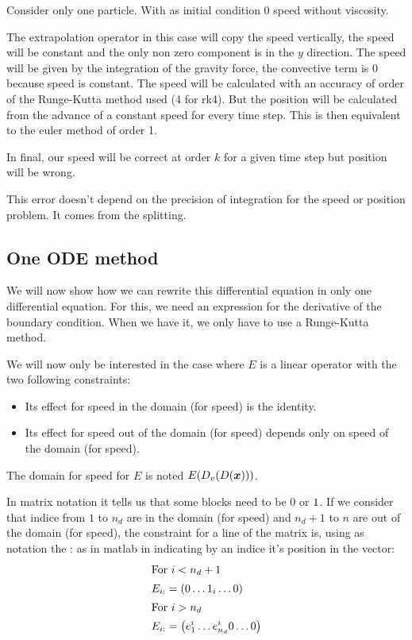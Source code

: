 \begin{example}
Consider only one particle. With as initial condition $0$ speed without viscosity.

The extrapolation operator in this case will copy the speed vertically,
the speed will be constant and the only non zero component is in the $y$ direction.
The speed will be given by the integration of the gravity force, the convective term is $0$ because speed is constant.
The speed will be calculated with an accuracy of order of the Runge-Kutta method used (4 for rk4).
But the position will be calculated from the advance of a constant speed for every time step. This is then equivalent to the euler
method of order 1.

In final, our speed will be correct at order $k$ for a given time step but position will be wrong.

This error doesn't depend on the precision of integration for the speed or position problem.
It comes from the splitting.
\end{example}

\subsection{One ODE method}
\label{differentialequation}
We will now show how we can rewrite this differential equation in only one differential equation.
For this, we need an expression for the derivative of the boundary condition.
When we have it, we only have to use a Runge-Kutta method.


We will now only be interested in the case where $E$ is a linear operator with the two following constraints:
\begin{itemize}
	\item Its effect for speed in the domain (for speed) is the identity.
	\item Its effect for speed out of the domain (for speed) depends only on speed of the domain (for speed).
\end{itemize}
The domain for speed for $E$ is noted $E(D_v(D({\boldsymbol {x}})))$.

In matrix notation it tells us that some blocks need to be $0$ or $1$.
If we consider that indice from $1$ to $n_d$ are in the domain (for speed) and $n_d+1$ to $n$ are out of the domain (for speed), the constraint for a line of the matrix is,
using as notation the : as in matlab in indicating by an indice it's position in the vector:
\begin{align}
	\intertext{For $i<n_d+1$}
	E_{i :}&=\left( 0 \ldots 1_{i} \ldots 0\right)\\
	\intertext{For $i>n_d$}
	E_{i :}&=\left( e^i_{1}\ldots e^i_{n_d} 0\ldots 0\right)\\
\end{align}

